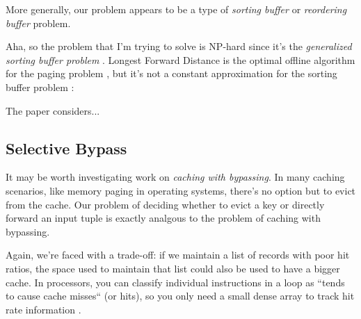 \documentclass[12pt]{article}
\begin{document}
More generally, our problem appears to be a type of \emph{sorting buffer} or \emph{reordering buffer} problem.

Aha, so the problem that I'm trying to solve is NP-hard since it's the \emph{generalized sorting buffer problem} \cite{sorting-buffer-np-hardness}.
Longest Forward Distance is the optimal offline algorithm for the paging problem \cite{lfd}, but it's not a constant approximation for the sorting buffer problem \cite{sorting-buffer-np-hardness}:

The paper \cite{competitive-reordering-algorithm} considers...



\subsection{Selective Bypass}
It may be worth investigating work on \emph{caching with bypassing}.  In many caching scenarios, like memory paging in operating systems, there's no option but to evict from the cache.  Our problem of deciding whether to evict a key or directly forward an input tuple is exactly analgous to the problem of caching with bypassing.

Again, we're faced with a trade-off: if we maintain a list of records with poor hit ratios, the space used to maintain that list could also be used to have a bigger cache.  In processors, you can classify individual instructions in a loop as ``tends to cause cache misses`` (or hits), so you only need a small dense array to track hit rate information \cite{automatic-cache-bypass}.






\end{document}
